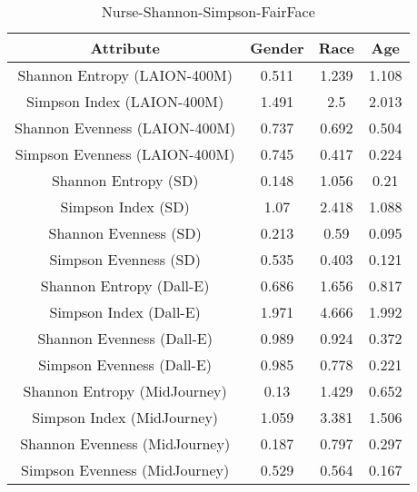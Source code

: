 \begin{table}[h]
\centering
\begin{tabular}{|c|c|c|c|}
\hline
Attribute & Gender & Race & Age \\
\hline
Shannon Entropy (LAION-400M) & 0.511  &  1.239  &  1.108 \\
Simpson Index (LAION-400M) & 1.491  &  2.5  &  2.013 \\
Shannon Evenness (LAION-400M) & 0.737  &  0.692  &  0.504 \\
Simpson Evenness (LAION-400M) & 0.745  &  0.417  &  0.224 \\
\hline
Shannon Entropy (SD) & 0.148  &  1.056  &  0.21 \\
Simpson Index (SD) & 1.07  &  2.418  &  1.088 \\
Shannon Evenness (SD) & 0.213  &  0.59  &  0.095 \\
Simpson Evenness (SD) & 0.535  &  0.403  &  0.121 \\
\hline
Shannon Entropy (Dall-E) & 0.686  &  1.656  &  0.817 \\
Simpson Index (Dall-E) & 1.971  &  4.666  &  1.992 \\
Shannon Evenness (Dall-E) & 0.989  &  0.924  &  0.372 \\
Simpson Evenness (Dall-E) & 0.985  &  0.778  &  0.221 \\
\hline
Shannon Entropy (MidJourney) & 0.13  &  1.429  &  0.652 \\
Simpson Index (MidJourney) & 1.059  &  3.381  &  1.506 \\
Shannon Evenness (MidJourney) & 0.187  &  0.797  &  0.297 \\
Simpson Evenness (MidJourney) & 0.529  &  0.564  &  0.167 \\
\hline
\end{tabular}
\caption{Nurse-Shannon-Simpson-FairFace}
\label{tab:nurse-shannon-simpson-fairFace}
\end{table}

